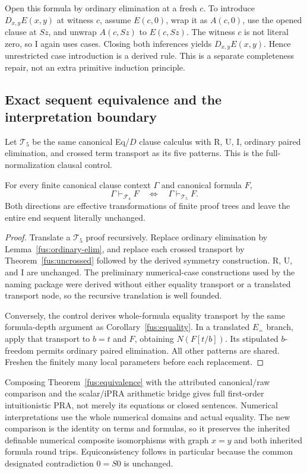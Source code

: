 Open this formula by ordinary elimination at a fresh $c$. To introduce
$D_{x,y}E(x,y)$ at witness $c$, assume $E(c,0)$, wrap it as $A(c,0)$,
use the opened clause at $Sz$, and unwrap $A(c,Sz)$ to $E(c,Sz)$.
The witness $c$ is not literal zero, so I again uses cases. Closing both
inferences yields $D_{x,y}E(x,y)$. Hence unrestricted case introduction
is a derived rule. This is a separate completeness repair, not an extra
primitive induction principle.

\subsection{Exact sequent equivalence and the interpretation boundary}

Let $\mathcal T_5$ be the same canonical Eq/$D$ clause calculus with R, U,
I, ordinary paired elimination, and crossed term transport as its five
patterns. This is the full-normalization clausal control.

\begin{theorem}
\label{fus:equivalence}
For every finite canonical clause context $\Gamma$ and canonical formula $F$,
\[
 \Gamma\vdash_{\mathcal F_4}F
 \quad\Longleftrightarrow\quad
 \Gamma\vdash_{\mathcal T_5}F.
\]
Both directions are effective transformations of finite proof trees and
leave the entire end sequent literally unchanged.
\end{theorem}
\begin{proof}
Translate a $\mathcal T_5$ proof recursively. Replace ordinary elimination
by Lemma~\ref{fus:ordinary-elim}, and replace each crossed transport by
Theorem~\ref{fus:uncrossed} followed by the derived symmetry construction.
R, U, and I are unchanged. The preliminary numerical-case constructions
used by the naming package were derived without either equality transport
or a translated transport node, so the recursive translation is well founded.

Conversely, the control derives whole-formula equality transport by the
same formula-depth argument as Corollary~\ref{fus:equality}. In a translated
$E_{=}$ branch, apply that transport to $b=t$ and $F$, obtaining
$N(F[t/b])$. Its stipulated $b$-freedom permits ordinary paired elimination.
All other patterns are shared. Freshen the finitely many local parameters
before each replacement.
\end{proof}

Composing Theorem~\ref{fus:equivalence} with the attributed canonical/raw
comparison and the scalar/iPRA arithmetic bridge gives full first-order
intuitionistic PRA, not merely its equations or closed sentences. Numerical
interpretations use the whole numerical domains and actual equality. The
new comparison is the identity on terms and formulas, so it preserves the
inherited definable numerical composite isomorphisms with graph $x=y$ and
both inherited formula round trips. Equiconsistency follows in particular
because the common designated contradiction $0=S0$ is unchanged.

